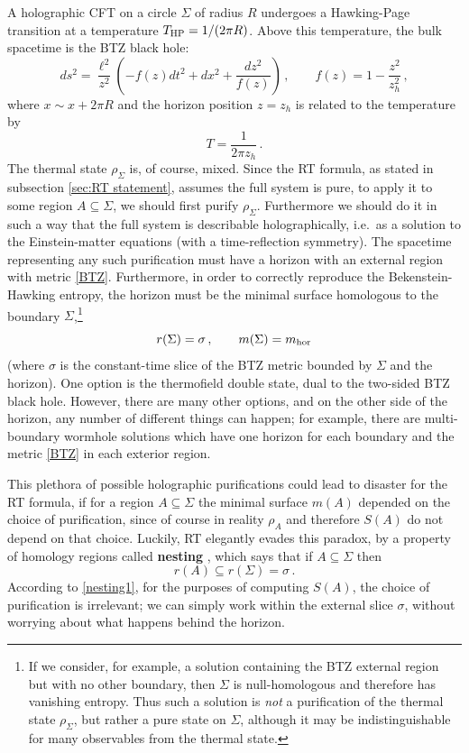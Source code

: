 \documentclass[11pt]{article}
\begin{document}
A holographic CFT on a circle $\Sigma$ of radius $R$ undergoes a Hawking-Page transition at a temperature $T_{\rm HP} = 1/(2\pi R)$. Above this temperature, the bulk spacetime is the BTZ black hole:
\begin{equation}\label{BTZ}
ds^2 = \frac{\ell^2}{z^2}\left(-f(z)dt^2+dx^2+\frac{dz^2}{f(z)}\right)\,,\qquad
f(z) = 1-\frac{z^2}{z_h^2}\,,
\end{equation}
where $x\sim x+2\pi R$ and the horizon position $z=z_h$ is related to the temperature by
\begin{equation}
T = \frac1{2\pi z_h}\,.
\end{equation}
The thermal state $\rho_\Sigma$ is, of course, mixed. Since the RT formula, as stated in subsection \ref{sec:RT statement}, assumes the full system is pure, to apply it to some region $A\subseteq\Sigma$, we should first purify $\rho_\Sigma$. Furthermore we should do it in such a way that the full system is describable holographically, i.e.\ as a solution to the Einstein-matter equations (with a time-reflection symmetry). The spacetime representing any such purification must have a horizon with an external region with metric \eqref{BTZ}. Furthermore, in order to correctly reproduce the Bekenstein-Hawking entropy, the horizon must be the minimal surface homologous to the boundary $\Sigma$,\footnote{If we consider, for example, a solution containing the BTZ external region but with no other boundary, then $\Sigma$ is null-homologous and therefore has vanishing entropy. Thus such a solution is \emph{not} a purification of the thermal state $\rho_\Sigma$, but rather a pure state on $\Sigma$, although it may be indistinguishable for many observables from the thermal state.}
\begin{equation}
r(\Sigma) = \sigma\,,\qquad m(\Sigma) = m_{\rm hor}
\end{equation}
(where $\sigma$ is the constant-time slice of the BTZ metric bounded by $\Sigma$ and the horizon). One option is the thermofield double state, dual to the two-sided BTZ black hole. However, there are many other options, and on the other side of the horizon, any number of different things can happen; for example, there are multi-boundary wormhole solutions which have one horizon for each boundary and the metric \eqref{BTZ} in each exterior region.

This plethora of possible holographic purifications could lead to disaster for the RT formula, if for a region $A\subseteq\Sigma$ the minimal surface $m(A)$ depended on the choice of purification, since of course in reality $\rho_A$ and therefore $S(A)$ do not depend on that choice. Luckily, RT elegantly evades this paradox, by a property of homology regions called \textbf{nesting} \cite{Headrick:2013zda}, which says that if $A\subseteq\Sigma$ then
\begin{equation}\label{nesting1}
r(A) \subseteq r(\Sigma) = \sigma\,.
\end{equation}
According to \eqref{nesting1}, for the purposes of computing $S(A)$, the choice of purification is irrelevant; we can simply work within the external slice $\sigma$, without worrying about what happens behind the horizon.
\end{document}
